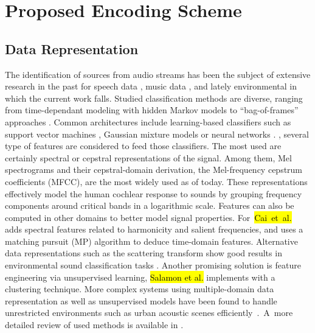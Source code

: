 \documentclass[sensors,article,accept,moreauthors,pdftex,10pt,a4paper]{mdpi}
\DeclareRobustCommand{\fg}[1]{{\sethlcolor{cyan}\hl{#1}}}
\begin{document}
\section{Proposed Encoding Scheme} \label{sec:coder}
\vspace{-6pt}

\subsection{Data Representation}

The identification of sources from audio streams has been the subject of extensive research in the past for speech data \cite{anusuya2009}, music data \cite{tzanetakis2002}, and lately environmental  in which the current work falls. Studied classification methods are diverse, ranging from time-dependant modeling with hidden Markov models \cite{ntalampiras2014} to ``bag-of-frames'' approaches \cite{aucouturier2007, foggia2015}. Common architectures include learning-based classifiers such as support vector machines \cite{kumar2016}, Gaussian mixture models \cite{radhakrishnan2005} or neural networks \cite{salamon2017, piczak2015}. , several type of features are considered to feed those classifiers. The most used are certainly spectral \cite{khunarsal2013} or cepstral \cite{couvreur2004} representations of the signal. Among them, Mel spectrograms and their cepstral-domain derivation, the Mel-frequency cepstrum coefficients (MFCC), are the most widely used as of today. These representations effectively model the human cochlear response to sounds by grouping frequency components around critical bands in a logarithmic scale. Features can also be computed in other domains to better model signal properties. \mbox{For  \fg{Cai et al.} \cite{cai2006}} adds spectral features related to harmonicity and salient frequencies, and \cite{chu2009} uses a matching pursuit (MP) algorithm to deduce time-domain features. Alternative data representations such as the scattering transform \cite{bauge2013} show good results in environmental sound classification tasks \cite{salamon2015}. Another promising solution is feature engineering via unsupervised learning,  \fg{Salamon et al.} \cite{salamon2015-2} implements with a clustering technique. More complex systems using multiple-domain data representation as well as unsupervised models have been found to handle unrestricted environments such as urban acoustic scenes \mbox{efficiently \citep{ntalampiras2012}. }A~more detailed review of used methods is available in \cite{chachada2013}.
\end{document}
